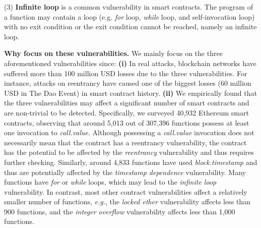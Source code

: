 (3) \textbf{Infinite loop} is a common vulnerability in smart contracts. The program of a function may contain a loop (e.g. \emph{for} loop, \emph{while} loop, and self-invocation loop) with no exit condition or the exit condition cannot be reached, namely an infinite loop. 

\textbf{Why focus on these vulnerabilities.} We mainly focus on the three aforementioned vulnerabilities since: \textbf{(i)} In real attacks, blockchain networks have suffered more than 100 million USD losses due to the three vulnerabilities. For instance, attacks on reentrancy have caused one of the biggest losses (60 million USD in The Dao Event) in smart contract history. \textbf{(ii)} We empirically found that the three vulnerabilities may affect a significant number of smart contracts and are non-trivial to be detected. Specifically, we surveyed 40,932 Ethereum smart contracts, observing that around 5,013 out of 307,396 functions  possess at least one invocation to \emph{call.value}. Although possessing a \emph{call.value} invocation does not necessarily mean that the contract has a reentrancy vulnerability, the contract has the potential to be affected by the \emph{reentrancy} vulnerability and thus requires further checking. Similarly, around 4,833 functions have used \emph{block.timestamp} and thus are potentially affected by the \emph{timestamp dependence} vulnerability. Many functions have \emph{for} or \emph{while} loops, which may lead to the \emph{infinite loop} vulnerability. In contrast, most other contract vulnerabilities affect a relatively smaller number of functions, \emph{e.g.}, the \emph{locked ether} vulnerability affects less than 900 functions, and the \emph{integer overflow} vulnerability affects less than 1,000 functions. 

\vspace{-0.7em}
